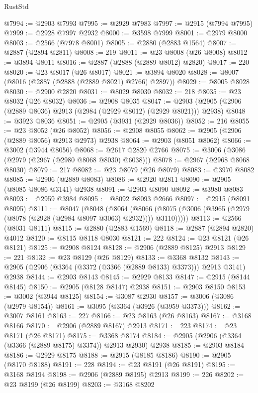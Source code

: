 \begin{lexlean}{RustStd}
\begin{coremodule}
{\begin{coremodule}
{{{{{{{{{{{{{{{{{{{{{{{{{{{{{{{{{{{{{{{{{{{{{{{{{{{{{{{{{{{{{{{{{{{{{{{{{{{{{{@7994 := @2903 @7993
@7995 := @2929 @7983
@7997 := @2915 (@7994 @7995)
@7999 := @2928 @7997 @2932
@8000 := @3598 @7999
@8001 := @2979 @8000
@8003 := @2566 (@7978 @8001)
@8005 := @2880 (@2883 @1564)
@8007 := @2887 (@2894 @2811)
@8008 := 219
@8011 := @23 @8008 (@26 @8008)
@8012 := @3894 @8011
@8016 := @2887 (@2888 (@2889 @8012) @2820)
@8017 := 220
@8020 := @23 @8017 (@26 @8017)
@8021 := @3894 @8020
@8028 := @8007 (@8016 (@2887 (@2888 (@2889 @8021) @2766) @2897))
@8029 := @8005 @8028
@8030 := @2900 @2820
@8031 := @8029 @8030
@8032 := 218
@8035 := @23 @8032 (@26 @8032)
@8036 := @2908 @8035
@8047 := @2903 (@2905 (@2906 (@2889 @8036) @2913 (@2984 (@2929 @8012) (@2929 @8021))) @2938)
@8048 := @3923 @8036
@8051 := @2905 (@3931 (@2929 @8036))
@8052 := 216
@8055 := @23 @8052 (@26 @8052)
@8056 := @2908 @8055
@8062 := @2905 (@2906 (@2889 @8056) @2913 @2973) @2938
@8064 := @2903 (@8051 @8062)
@8066 := @3002 (@3944 @8056)
@8068 := @2617 @2820 @2766
@8075 := @3006 (@3086 (@2979 (@2967 (@2980 @8068 @8030) @6038)))
@8078 := @2967 (@2968 @8068 @8030)
@8079 := 217
@8082 := @23 @8079 (@26 @8079)
@8083 := @3970 @8082
@8085 := @2906 (@2889 @8083)
@8086 := @2920 @2811
@8090 := @2905 (@8085 @8086 @3141) @2938
@8091 := @2903 @8090
@8092 := @3980 @8083
@8093 := @2959 @3984
@8095 := @8092 @8093 @2666
@8097 := @2915 (@8091 @8095)
@8111 := @8047
    (@8048
      (@8064
        (@8066 (@8075 (@3006 (@3965 (@2979 (@8078 (@2928 (@2984 @8097 @3063) @2932)))) @3110)))))
@8113 := @2566 (@8031 @8111)
@8115 := @2880 (@2883 @1569)
@8118 := @2887 (@2894 @2820) @4012
@8120 := @8115 @8118 @8030
@8121 := 222
@8124 := @23 @8121 (@26 @8121)
@8125 := @2908 @8124
@8128 := @2906 (@2889 @8125) @2913
@8129 := 221
@8132 := @23 @8129 (@26 @8129)
@8133 := @3368 @8132
@8143 := @2905 (@2906 (@3364 (@3372 (@3366 (@2889 @8133) @3373))) @2913 @3141) @2938
@8144 := @2903 @8143
@8145 := @2929 @8133
@8147 := @2915 (@8144 @8145)
@8150 := @2905 (@8128 @8147) @2938
@8151 := @2903 @8150
@8153 := @3002 (@3944 @8125)
@8154 := @3087 @2930
@8157 := @3006 (@3086 (@2979 @8154))
@8161 := @3095 (@3364 (@3926 (@3959 @3373)))
@8162 := @3007 @8161
@8163 := 227
@8166 := @23 @8163 (@26 @8163)
@8167 := @3168 @8166
@8170 := @2906 (@2889 @8167) @2913
@8171 := 223
@8174 := @23 @8171 (@26 @8171)
@8175 := @3368 @8174
@8184 := @2905 (@2906 (@3364 (@3366 (@2889 @8175) @3374)) @2913 @2930) @2938
@8185 := @2903 @8184
@8186 := @2929 @8175
@8188 := @2915 (@8185 @8186)
@8190 := @2905 (@8170 @8188)
@8191 := 228
@8194 := @23 @8191 (@26 @8191)
@8195 := @3168 @8194
@8198 := @2906 (@2889 @8195) @2913
@8199 := 226
@8202 := @23 @8199 (@26 @8199)
@8203 := @3168 @8202
}}}}}}}}}}}}}}}}}}}}}}}}}}}}}}}}}}}}}}}}}}}}}}}}}}}}}}}}}}}}}}}}}}}}}}}}}}}}}}
\end{coremodule}}
\end{coremodule}
\end{lexlean}
